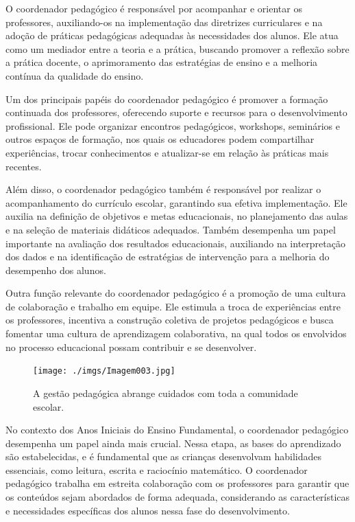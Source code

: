 O coordenador pedagógico é responsável por acompanhar e orientar os
professores, auxiliando-os na implementação das diretrizes curriculares
e na adoção de práticas pedagógicas adequadas às necessidades dos
alunos. Ele atua como um mediador entre a teoria e a prática, buscando
promover a reflexão sobre a prática docente, o aprimoramento das
estratégias de ensino e a melhoria contínua da qualidade do ensino.

Um dos principais papéis do coordenador pedagógico é promover a formação
continuada dos professores, oferecendo suporte e recursos para o
desenvolvimento profissional. Ele pode organizar encontros pedagógicos,
workshops, seminários e outros espaços de formação, nos quais os
educadores podem compartilhar experiências, trocar conhecimentos e
atualizar-se em relação às práticas mais recentes.

Além disso, o coordenador pedagógico também é responsável por realizar o
acompanhamento do currículo escolar, garantindo sua efetiva
implementação. Ele auxilia na definição de objetivos e metas
educacionais, no planejamento das aulas e na seleção de materiais
didáticos adequados. Também desempenha um papel importante na avaliação
dos resultados educacionais, auxiliando na interpretação dos dados e na
identificação de estratégias de intervenção para a melhoria do
desempenho dos alunos.

Outra função relevante do coordenador pedagógico é a promoção de uma
cultura de colaboração e trabalho em equipe. Ele estimula a troca de
experiências entre os professores, incentiva a construção coletiva de
projetos pedagógicos e busca fomentar uma cultura de aprendizagem
colaborativa, na qual todos os envolvidos no processo educacional possam
contribuir e se desenvolver.

\begin{figure}
\centering
\texttt{[image: ./imgs/Imagem003.jpg]}
\caption{A gestão pedagógica abrange cuidados com toda a comunidade
escolar.}
\end{figure}

No contexto dos Anos Iniciais do Ensino Fundamental, o coordenador
pedagógico desempenha um papel ainda mais crucial. Nessa etapa, as bases
do aprendizado são estabelecidas, e é fundamental que as crianças
desenvolvam habilidades essenciais, como leitura, escrita e raciocínio
matemático. O coordenador pedagógico trabalha em estreita colaboração
com os professores para garantir que os conteúdos sejam abordados de
forma adequada, considerando as características e necessidades
específicas dos alunos nessa fase do desenvolvimento.


